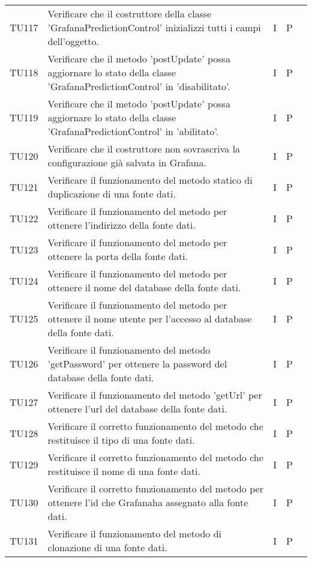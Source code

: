 \begin{longtable} {
		>{}p{15mm} 
		>{}p{79.5mm}
		>{}p{15mm} 
		>{}p{15mm}
		>{}p{0mm}}
	TU117		& Verificare che il costruttore della classe 'GrafanaPredictionControl' inizializzi tutti i campi dell'oggetto.& I & P &\TBstrut \\ [2mm]
	TU118		& Verificare che il metodo 'postUpdate' possa aggiornare lo stato della classe 'GrafanaPredictionControl' in 'disabilitato'.& I & P &\TBstrut \\ [2mm]
	TU119		& Verificare che il metodo 'postUpdate' possa aggiornare lo stato della classe 'GrafanaPredictionControl' in 'abilitato'.& I & P &\TBstrut \\ [2mm]
	TU120	      	& Verificare che il costruttore non sovrascriva la configurazione già salvata in Grafana\glo.& I & P &\TBstrut \\ [2mm]
	TU121		& Verificare il funzionamento del metodo statico di duplicazione di una fonte dati.& I & P &\TBstrut \\ [2mm]
	TU122		& Verificare il funzionamento del metodo per ottenere l'indirizzo della fonte dati.& I & P &\TBstrut \\ [2mm]
	TU123		& Verificare il funzionamento del metodo per ottenere la porta della fonte dati.& I & P &\TBstrut \\ [2mm]
	TU124		& Verificare il funzionamento del metodo per ottenere il nome del database della fonte dati.& I & P &\TBstrut \\ [2mm]
	TU125		& Verificare il funzionamento del metodo per ottenere il nome utente per l'accesso al database della fonte dati.& I & P &\TBstrut \\ [2mm]
	TU126		& Verificare il funzionamento del metodo 'getPassword' per ottenere la password del database della fonte dati.& I & P &\TBstrut \\ [2mm]
	TU127		& Verificare il funzionamento del metodo 'getUrl' per ottenere l'url del database della fonte dati.& I & P &\TBstrut \\ [2mm]
	TU128		& Verificare il corretto funzionamento del metodo che restituisce il tipo di una fonte dati. & I & P &\TBstrut \\ [2mm]
	TU129		& Verificare il corretto funzionamento del metodo che restituisce il nome di una fonte dati. & I & P &\TBstrut \\ [2mm]
	TU130		& Verificare il corretto funzionamento del metodo per ottenere l'id che Grafana\glosp ha assegnato alla fonte dati. & I & P &\TBstrut \\ [2mm]
	TU131		& Verificare il funzionamento del metodo di clonazione di una fonte dati.& I & P &\TBstrut \\ [2mm]

\end{longtable}
